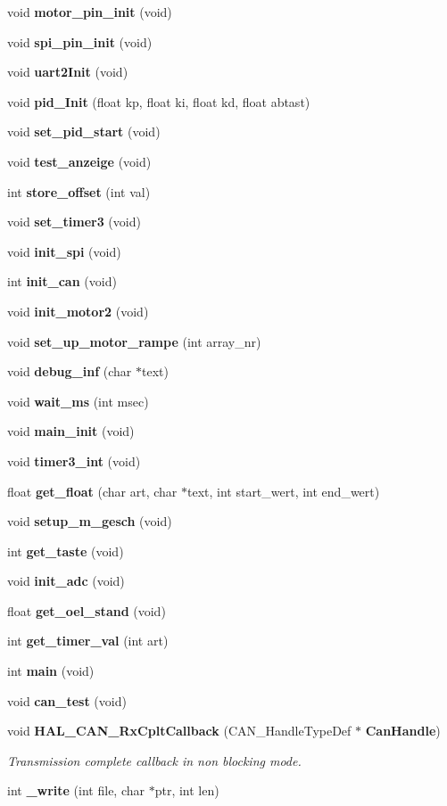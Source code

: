 \begin{DoxyCompactItemize}
void \textbf{ motor\+\_\+pin\+\_\+init} (void)
\item 
void \textbf{ spi\+\_\+pin\+\_\+init} (void)
\item 
void \textbf{ uart2\+Init} (void)
\item 
void \textbf{ pid\+\_\+\+Init} (float kp, float ki, float kd, float abtast)
\item 
void \textbf{ set\+\_\+pid\+\_\+start} (void)
\item 
void \textbf{ test\+\_\+anzeige} (void)
\item 
int \textbf{ store\+\_\+offset} (int val)
\item 
void \textbf{ set\+\_\+timer3} (void)
\item 
void \textbf{ init\+\_\+spi} (void)
\item 
int \textbf{ init\+\_\+can} (void)
\item 
void \textbf{ init\+\_\+motor2} (void)
\item 
void \textbf{ set\+\_\+up\+\_\+motor\+\_\+rampe} (int array\+\_\+nr)
\item 
void \textbf{ debug\+\_\+inf} (char $\ast$text)
\item 
void \textbf{ wait\+\_\+ms} (int msec)
\item 
void \textbf{ main\+\_\+init} (void)
\item 
void \textbf{ timer3\+\_\+int} (void)
\item 
float \textbf{ get\+\_\+float} (char art, char $\ast$text, int start\+\_\+wert, int end\+\_\+wert)
\item 
void \textbf{ setup\+\_\+m\+\_\+gesch} (void)
\item 
int \textbf{ get\+\_\+taste} (void)
\item 
void \textbf{ init\+\_\+adc} (void)
\item 
float \textbf{ get\+\_\+oel\+\_\+stand} (void)
\item 
int \textbf{ get\+\_\+timer\+\_\+val} (int art)
\item 
int \textbf{ main} (void)
\item 
void \textbf{ can\+\_\+test} (void)
\item 
void \textbf{ H\+A\+L\+\_\+\+C\+A\+N\+\_\+\+Rx\+Cplt\+Callback} (C\+A\+N\+\_\+\+Handle\+Type\+Def $\ast$\textbf{ Can\+Handle})
\begin{DoxyCompactList}\small\item\em Transmission complete callback in non blocking mode. \end{DoxyCompactList}\item 
int \textbf{ \+\_\+write} (int file, char $\ast$ptr, int len)
\end{DoxyCompactItemize}
